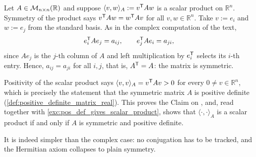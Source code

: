 \begin{exercisesolution}
\label{sol:real_case_of_claim}
  Let $A \in \mathcal{M}_{n \times n}(\mathbb{R})$ and suppose $\langle v, w \rangle_A := v^{\mathsf{T}} A w$ is a scalar product on $\mathbb{R}^n$. Symmetry of the product says $v^{\mathsf{T}} A w = w^{\mathsf{T}} A v$ for all $v, w \in \mathbb{R}^n$. Take $v := e_i$ and $w := e_j$ from the standard basis. As in the complex computation of the text,
  \[ e_i^{\mathsf{T}} A e_j = a_{ij}, \qquad e_j^{\mathsf{T}} A e_i = a_{ji}, \]
  since $A e_j$ is the $j$-th column of $A$ and left multiplication by $e_i^{\mathsf{T}}$ selects its $i$-th entry. Hence, $a_{ij} = a_{ji}$ for all $i, j$, that is, $A^{\mathsf{T}} = A$: the matrix is symmetric.

  Positivity of the scalar product says $\langle v, v \rangle_A = v^{\mathsf{T}} A v > 0$ for every $0 \ne v \in \mathbb{R}^n$, which is precisely the statement that the symmetric matrix $A$ is positive definite (\cref{def:positive_definite_matrix_real}). This proves the Claim on , and, read together with \cref{exc:pos_def_gives_scalar_product}, shows that $\langle \cdot, \cdot \rangle_A$ is a scalar product if and only if $A$ is symmetric and positive definite.

  It is indeed simpler than the complex case: no conjugation has to be tracked, and the Hermitian axiom collapses to plain symmetry.
\end{exercisesolution}


